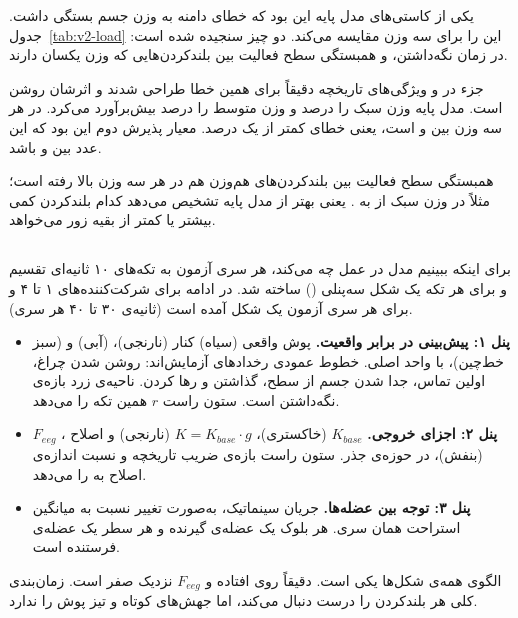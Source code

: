 یکی از کاستی‌های مدل پایه این بود که خطای دامنه به وزن جسم بستگی داشت. جدول~\ref{tab:v2-load} این را برای سه وزن مقایسه می‌کند. دو چیز سنجیده شده است:  در زمان نگه‌داشتن، و همبستگی سطح فعالیت بین بلندکردن‌هایی که وزن یکسان دارند.

جزء  در  و ویژگی‌های تاریخچه دقیقاً برای همین خطا طراحی شدند و اثرشان روشن است. مدل پایه وزن سبک را  درصد و وزن متوسط را  درصد بیش‌برآورد می‌کرد.   در هر سه وزن بین  و  است، یعنی خطای کمتر از یک درصد. معیار پذیرش دوم این بود که این عدد بین  و  باشد.

همبستگی سطح فعالیت بین بلندکردن‌های هم‌وزن هم در هر سه وزن بالا رفته است؛ مثلاً در وزن سبک از  به . یعنی  بهتر از مدل پایه تشخیص می‌دهد کدام بلندکردن کمی بیشتر یا کمتر از بقیه زور می‌خواهد.



\subsection{}

برای اینکه ببینیم مدل در عمل چه می‌کند، هر سری آزمون به تکه‌های ۱۰ ثانیه‌ای تقسیم و برای هر تکه یک شکل سه‌پنلی () ساخته شد. در ادامه برای شرکت‌کننده‌های ۱ تا ۴ و برای هر سری آزمون یک شکل آمده است (ثانیه‌ی ۳۰ تا ۴۰ هر سری).

\begin{itemize}
\item \textbf{پنل ۱: پیش‌بینی در برابر واقعیت.} پوش واقعی (سیاه) کنار  (نارنجی)،  (آبی) و  (سبز خط‌چین)، با واحد اصلی. خطوط عمودی رخدادهای آزمایش‌اند: روشن شدن چراغ، اولین تماس، جدا شدن جسم از سطح، گذاشتن و رها کردن. ناحیه‌ی زرد بازه‌ی نگه‌داشتن است. ستون راست $r$ همین تکه را می‌دهد.
\item \textbf{پنل ۲: اجزای خروجی.} $K_{base}$ (خاکستری)، $K=K_{base}\cdot g$ (نارنجی) و اصلاح ، $F_{eeg}$ (بنفش)، در حوزه‌ی جذر. ستون راست بازه‌ی ضریب تاریخچه و نسبت اندازه‌ی اصلاح  به  را می‌دهد.
\item \textbf{پنل ۳: توجه بین عضله‌ها.}   جریان سینماتیک، به‌صورت تغییر نسبت به میانگین استراحت همان سری. هر بلوک یک عضله‌ی گیرنده و هر سطر یک عضله‌ی فرستنده است.
\end{itemize}

الگوی همه‌ی شکل‌ها یکی است.  دقیقاً روی  افتاده و $F_{eeg}$ نزدیک صفر است.  زمان‌بندی کلی هر بلندکردن را درست دنبال می‌کند، اما جهش‌های کوتاه و تیز پوش را ندارد.

\clearpage
